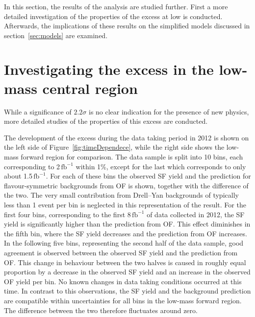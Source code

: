 \label{sec:newInt}
In this section, the results of the analysis are studied further. First a more detailed investigation of the properties of the excess at low \mll is conducted. Afterwards, the implications of these results on the  simplified models discussed in section~\ref{sec:models} are examined.
\section{Investigating the excess in the low-mass central region}
While a significance of $2.2\sigma$ is no clear indication for the presence of new physics, more detailed studies of the properties of this excess are conducted. 

The development of the excess during the data taking period in 2012 is shown on the left side of Figure~\ref{fig:timeDependece}, while the right side shows the low-mass forward region for comparison. The data sample is split into 10 bins, each corresponding to 2\,$\mathrm{fb}^{-1}$ within 1\%, except for the last which corresponds to only  about 1.5\,$\mathrm{fb}^{-1}$. For each of these bins the observed SF yield and the prediction for flavour-symmetric backgrounds from OF is shown, together with the difference of the two. The very small contribution from Drell--Yan backgrounds of typically less than 1 event per bin is neglected in this representation of the result. For the first four bins, corresponding to the first 8\,$\mathrm{fb}^{-1}$ of data collected in 2012, the SF yield is significantly higher than the prediction from OF. This effect diminishes in the fifth bin, where the SF yield decreases and the prediction from OF increases. In the following five bins, representing the second half of the data sample, good agreement is observed between the observed SF yield and the prediction from OF. This change in behaviour between the two halves is caused in roughly equal proportion by a decrease in the observed SF yield and an increase in the observed OF yield per bin. No known changes in data taking conditions occurred at this time. In contrast to this observations, the SF yield and the background prediction are compatible within uncertainties for all bins in the low-mass forward region. The difference between the two therefore fluctuates around zero.

